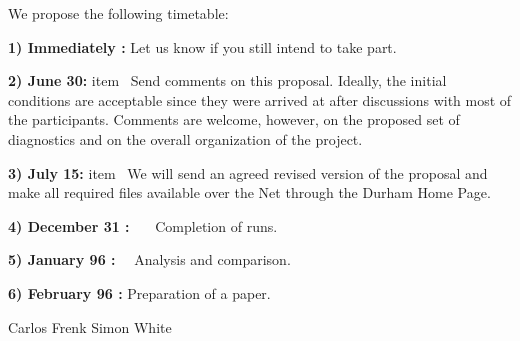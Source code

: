 We propose the following timetable:

{\bf 1) Immediately :}  \quad Let us know if you still intend to take 
part.

{\bf 2) June 30:} \3item \ Send comments on this proposal. Ideally, the 
                  initial conditions are acceptable since they were arrived at
                  after discussions with most of the participants. 
                   Comments are welcome, however, on the proposed set of
                   diagnostics and on the overall organization of the project.
 
{\bf 3) July 15:}  \3item \  We will send an agreed revised version of the 
                    proposal and make all required files available over the
                    Net through the Durham Home Page. 

{\bf 4) December 31 :} \ \ \  Completion of runs.

{\bf 5) January 96  :} \quad \ \ Analysis and comparison.

{\bf 6) February 96 :}    \quad Preparation of a paper.

\bigskip

Carlos Frenk \hfill\break
Simon White 
\vfill\eject\bye 


